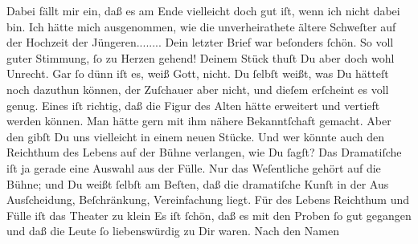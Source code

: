 \begin{ledgroupsized}[t]{13cm}
           \pstart
           Dabei fällt mir ein, daß es am Ende vielleicht doch gut iſt, wenn ich nicht dabei
               bin. Ich hätte mich ausgenommen, wie die unverheirathete ältere Schweſter auf der
               Hochzeit der Jüngeren........\pend
           \pstart
           Dein letzter Brief war beſonders ſchön. So voll guter Stimmung, ſo zu Herzen gehend!
               Deinem Stück thuſt Du aber
               doch wohl Unrecht. Gar ſo {\pb} dünn iſt es, weiß Gott, nicht. Du ſelbſt weißt, was Du hätteſt  noch dazuthun können, der Zuſchauer aber nicht,
               und dieſem erſcheint es voll genug. Eines iſt  richtig, daß die Figur des Alten hätte erweitert und vertieft werden können. Man hätte gern mit ihm
               nähere Bekanntſchaft gemacht. Aber den gibſt Du uns vielleicht in einem neuen Stücke.
               Und wer könnte auch den Reichthum des Lebens auf der Bühne verlangen, wie Du ſagſt?
                  \strikeout{\textcolor{gray}{×}} Das {\pb}Dramatiſche iſt ja gerade eine Auswahl
               aus der Fülle. Nur das Weſentliche gehört  auf die
               Bühne; und Du weißt ſelbſt am Beſten, daß die dramatiſche Kunſt in der Aus\strikeout{\textcolor{gray}{×}} Ausſcheidung, Beſchränkung, Vereinfachung liegt. Für des Lebens Reichthum und
               Fülle  iſt das Theater zu klein{\dotssix}\pend
           \pstart
           Es iſt ſchön, daß es mit den Proben ſo gut gegangen und daß die Leute ſo
               liebenswürdig zu Dir waren.  Nach den Namen

\end{ledgroupsized}
